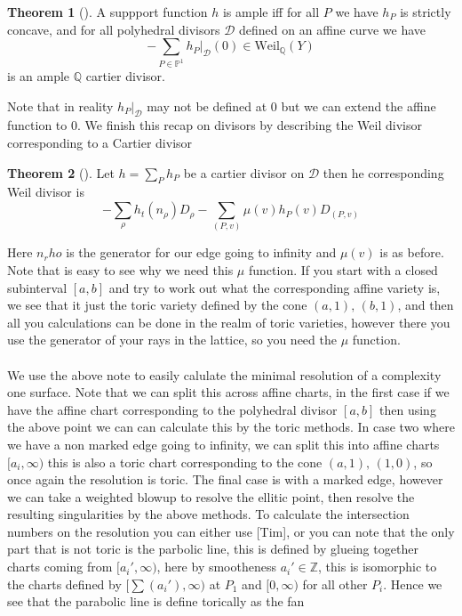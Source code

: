 \documentclass[11pt]{report}
\theoremstyle{definition}
\newtheorem{thm}{Theorem}[section]
\theoremstyle{definition}
\theoremstyle{definition}
\theoremstyle{definition}
\theoremstyle{definition}
\theoremstyle{definition}
\theoremstyle{definition}
\begin{document}
\begin{thm}[\cite{PS}]
A suppport function $h$ is ample iff for all $P$ we have $h_P$ is strictly concave, and for all polyhedral divisors $\mathcal{D}$ defined on an affine curve we have
\[
- \sum_{P \in \mathbb{P}^1} h_P |_\mathcal{D} (0) \in \text{Weil}_\mathbb{Q} (Y)
\]
 is an ample $\mathbb{Q}$ cartier divisor.
\end{thm}
Note that in reality $h_P |_\mathcal{D}$ may not be defined at $0$ but we can extend the affine function to $0$. We finish this recap on divisors by describing the Weil divisor corresponding to a Cartier divisor
\begin{thm}[\cite{PS}]
Let $h = \sum_P h_P$ be a cartier divisor on $\mathcal{D}$ then he corresponding Weil divisor is 
\[
- \sum_\rho h_t ( n_\rho) D_\rho - \sum_{(P, v)} \mu(v) h_P(v) D_{(P,v)}
\]
\end{thm}
Here $n_rho$ is the generator for our edge going to infinity and $\mu(v)$ is as before. Note that is easy to see why we need this $\mu$ function. If you start with a closed subinterval $[a, b]$ and try to work out what the corresponding affine variety is, we see that it just the toric variety defined by the cone $(a,1), \, (b,1)$, and then all you calculations can be done in the realm of toric varieties, however there you use the generator of your rays in the lattice, so you need the $\mu$ function.
\\
\\
We use the above note to easily calulate the minimal resolution of a complexity one surface. Note that we can split this across affine charts, in the first case if we have the affine chart corresponding to the polyhedral divisor $[a,b]$ then using the above point we can can calculate this by the toric methods. In case two where we have a non marked edge going to infinity, we can split this into affine charts $[a_i, \infty)$ this is also a toric chart corresponding to the cone $(a,1), \, (1,0)$, so once again the resolution is toric. The final case is with a marked edge, however we can take a weighted blowup to resolve the ellitic point, then resolve the resulting singularities by the above methods. To calculate the intersection numbers on the resolution you can either use [Tim], \cite{PS} or you can note that the only part that is not toric is the parbolic line, this is defined by glueing together charts coming from $[a_i', \infty)$, here by smootheness $a_i' \in \mathbb{Z}$, this is isomorphic to the charts defined by $[\sum(a_i'), \infty)$ at $P_1$ and $[0, \infty)$ for all other $P_i$. Hence we see that the parabolic line is define torically as the fan  
\end{document}
